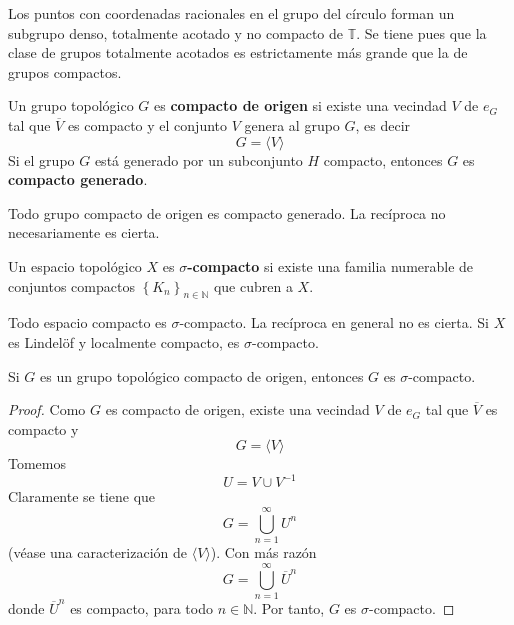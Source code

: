 \documentclass[12pt]{report}
\theoremstyle{largebreak}
\newcommand{\Cls}[1]{\ensuremath{\overline{#1}}}
\newcommand{\gen}[1]{\ensuremath{\langle#1\rangle}}
\begin{document}
    \begin{exa}
        Los puntos con coordenadas racionales en el grupo del círculo forman un subgrupo denso, totalmente acotado y no compacto de $\mathbb{T}$. Se tiene pues que la clase de grupos totalmente acotados es estrictamente más grande que la de grupos compactos.
    \end{exa}

    \begin{mydef}
        Un grupo topológico $G$ es \textbf{compacto de origen} si existe una vecindad $V$ de $e_G$ tal que $\Cls{V}$ es compacto y el conjunto $V$ genera al grupo $G$, es decir
        \begin{equation*}
            G=\gen{V}
        \end{equation*}
        Si el grupo $G$ está generado por un subconjunto $H$ compacto, entonces $G$ es \textbf{compacto generado}.
    \end{mydef}
    
    \begin{obs}
        Todo grupo compacto de origen es compacto generado. La recíproca no necesariamente es cierta.
    \end{obs}

    \begin{mydef}
        Un espacio topológico $X$ es \textbf{$\sigma$-compacto} si existe una familia numerable de conjuntos compactos $\left\{K_n\right\}_{ n\in\mathbb{N}}$ que cubren a $X$.
    \end{mydef}

    \begin{obs}
        Todo espacio compacto es $\sigma$-compacto. La recíproca en general no es cierta. Si $X$ es Lindelöf y localmente compacto, es $\sigma$-compacto.
    \end{obs}

    \begin{lema}
        Si $G$ es un grupo topológico compacto de origen, entonces $G$ es $\sigma$-compacto.
    \end{lema}

    \begin{proof}
        Como $G$ es compacto de origen, existe una vecindad $V$ de $e_G$ tal que $\Cls{V}$ es compacto y
        \begin{equation*}
            G=\gen{V}
        \end{equation*}
        Tomemos
        \begin{equation*}
            U=V\cup V^{-1}
        \end{equation*}
        Claramente se tiene que
        \begin{equation*}
            G=\bigcup_{ n=1}^{\infty}U^n
        \end{equation*}
        (véase una caracterización de $\gen{V}$). Con más razón
        \begin{equation*}
            G=\bigcup_{ n=1}^{\infty}\Cls{U}^n
        \end{equation*}
        donde $\Cls{U}^n$ es compacto, para todo $n\in\mathbb{N}$. Por tanto, $G$ es $\sigma$-compacto.
    \end{proof}
\end{document}
